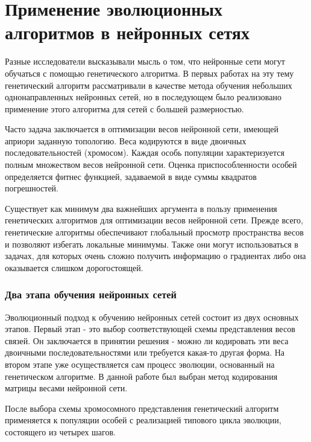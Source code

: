 \section{Применение эволюционных алгоритмов в нейронных сетях}

\indent \indent Разные исследователи высказывали мысль о том, что нейронные сети могут обучаться с помощью генетического алгоритма.
В первых работах на эту тему генетический алгоритм рассматривали в качестве метода обучения небольших однонаправленных нейронных сетей, но в последующем было реализовано применение этого алгоритма для сетей с большей размерностью.

Часто задача заключается в оптимизации весов нейронной сети, имеющей априори заданную топологию. Веса кодируются в виде двоичных последовательностей (хромосом). Каждая особь популяции характеризуется полным множеством весов нейронной сети. Оценка приспособленности особей определяется фитнес функцией, задаваемой в виде суммы квадратов погрешностей.

Существует как минимум два важнейших аргумента в пользу применения генетических алгоритмов для оптимизации весов нейронной сети. Прежде всего, генетические алгоритмы обеспечивают глобальный просмотр пространства весов и позволяют избегать локальные минимумы. Также они могут использоваться в задачах, для которых  очень сложно получить информацию о градиентах либо она оказывается слишком дорогостоящей.

\subsubsection*{Два этапа обучения нейронных сетей}

Эволюционный подход к обучению нейронных сетей состоит из двух основных этапов. Первый этап - это выбор соответствующей схемы представления весов связей. Он заключается в принятии решения - можно ли кодировать эти веса двоичными последовательностями или требуется какая-то другая форма. На втором этапе уже осуществляется сам процесс эволюции, основанный на генетическом алгоритме. В данной работе был выбран метод кодирования матрицы весами нейронной сети.

После выбора схемы хромосомного представления генетический алгоритм применяется к популяции особей с реализацией типового цикла эволюции, состоящего из четырех шагов.


